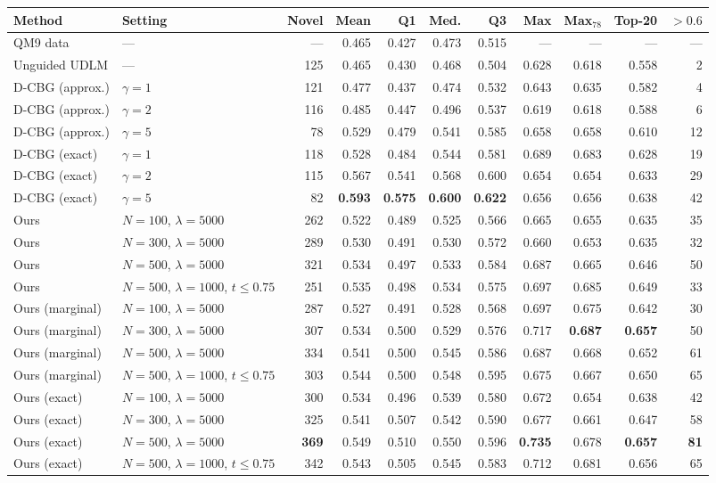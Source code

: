 \begin{tabular}{ll rrrrr rrr r}
\toprule
Method & Setting & Novel & Mean & Q1 & Med. & Q3 & Max & Max$_{78}$ & Top-20 & $>0.6$ \\
\midrule
QM9 data & --- & --- & 0.465 & 0.427 & 0.473 & 0.515 & --- & --- & --- & --- \\
\midrule
Unguided UDLM & --- & 125 & 0.465 & 0.430 & 0.468 & 0.504 & 0.628 & 0.618 & 0.558 & 2 \\
\midrule
D-CBG (approx.) & $\gamma = 1$ & 121 & 0.477 & 0.437 & 0.474 & 0.532 & 0.643 & 0.635 & 0.582 & 4 \\
D-CBG (approx.) & $\gamma = 2$ & 116 & 0.485 & 0.447 & 0.496 & 0.537 & 0.619 & 0.618 & 0.588 & 6 \\
D-CBG (approx.) & $\gamma = 5$ & 78 & 0.529 & 0.479 & 0.541 & 0.585 & 0.658 & 0.658 & 0.610 & 12 \\
\midrule
D-CBG (exact) & $\gamma = 1$ & 118 & 0.528 & 0.484 & 0.544 & 0.581 & 0.689 & 0.683 & 0.628 & 19 \\
D-CBG (exact) & $\gamma = 2$ & 115 & 0.567 & 0.541 & 0.568 & 0.600 & 0.654 & 0.654 & 0.633 & 29 \\
D-CBG (exact) & $\gamma = 5$ & 82 & \textbf{0.593} & \textbf{0.575} & \textbf{0.600} & \textbf{0.622} & 0.656 & 0.656 & 0.638 & 42 \\
\midrule
Ours & $N{=}100$, $\lambda{=}5000$ & 262 & 0.522 & 0.489 & 0.525 & 0.566 & 0.665 & 0.655 & 0.635 & 35 \\
Ours & $N{=}300$, $\lambda{=}5000$ & 289 & 0.530 & 0.491 & 0.530 & 0.572 & 0.660 & 0.653 & 0.635 & 32 \\
Ours & $N{=}500$, $\lambda{=}5000$ & 321 & 0.534 & 0.497 & 0.533 & 0.584 & 0.687 & 0.665 & 0.646 & 50 \\
Ours & $N{=}500$, $\lambda{=}1000$, $t \le 0.75$ & 251 & 0.535 & 0.498 & 0.534 & 0.575 & 0.697 & 0.685 & 0.649 & 33 \\
\midrule
Ours (marginal) & $N{=}100$, $\lambda{=}5000$ & 287 & 0.527 & 0.491 & 0.528 & 0.568 & 0.697 & 0.675 & 0.642 & 30 \\
Ours (marginal) & $N{=}300$, $\lambda{=}5000$ & 307 & 0.534 & 0.500 & 0.529 & 0.576 & 0.717 & \textbf{0.687} & \textbf{0.657} & 50 \\
Ours (marginal) & $N{=}500$, $\lambda{=}5000$ & 334 & 0.541 & 0.500 & 0.545 & 0.586 & 0.687 & 0.668 & 0.652 & 61 \\
Ours (marginal) & $N{=}500$, $\lambda{=}1000$, $t \le 0.75$ & 303 & 0.544 & 0.500 & 0.548 & 0.595 & 0.675 & 0.667 & 0.650 & 65 \\
\midrule
Ours (exact) & $N{=}100$, $\lambda{=}5000$ & 300 & 0.534 & 0.496 & 0.539 & 0.580 & 0.672 & 0.654 & 0.638 & 42 \\
Ours (exact) & $N{=}300$, $\lambda{=}5000$ & 325 & 0.541 & 0.507 & 0.542 & 0.590 & 0.677 & 0.661 & 0.647 & 58 \\
Ours (exact) & $N{=}500$, $\lambda{=}5000$ & \textbf{369} & 0.549 & 0.510 & 0.550 & 0.596 & \textbf{0.735} & 0.678 & \textbf{0.657} & \textbf{81} \\
Ours (exact) & $N{=}500$, $\lambda{=}1000$, $t \le 0.75$ & 342 & 0.543 & 0.505 & 0.545 & 0.583 & 0.712 & 0.681 & 0.656 & 65 \\
\bottomrule
\end{tabular}
